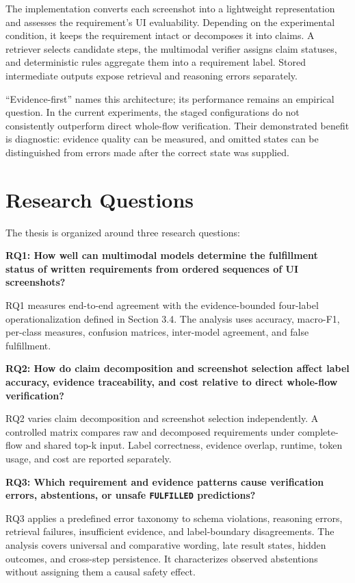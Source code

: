 The implementation converts each screenshot into a lightweight representation
and assesses the requirement's UI evaluability. Depending on the experimental
condition, it keeps the requirement intact or decomposes it into claims. A
retriever selects candidate steps, the multimodal verifier assigns claim
statuses, and deterministic rules aggregate them into a requirement label.
Stored intermediate outputs expose retrieval and reasoning errors separately.

``Evidence-first'' names this architecture; its performance remains an empirical
question. In the current experiments, the staged configurations do not
consistently outperform direct whole-flow verification. Their demonstrated
benefit is diagnostic: evidence quality can be measured, and omitted states can
be distinguished from errors made after the correct state was supplied.

\section{Research Questions}\label{research-questions}

The thesis is organized around three research questions:

\textbf{RQ1: How well can multimodal models determine the fulfillment status of written requirements from ordered sequences of UI screenshots?}

RQ1 measures end-to-end agreement with the evidence-bounded four-label
operationalization defined in Section 3.4. The analysis uses accuracy,
macro-F1, per-class measures, confusion matrices, inter-model agreement, and
false fulfillment.

\textbf{RQ2: How do claim decomposition and screenshot selection affect label accuracy, evidence traceability, and cost relative to direct whole-flow verification?}

RQ2 varies claim decomposition and screenshot selection independently. A
controlled matrix compares raw and decomposed requirements under complete-flow
and shared top-k input. Label correctness, evidence overlap, runtime, token usage, and
cost are reported separately.

\textbf{RQ3: Which requirement and evidence patterns cause verification errors, abstentions, or unsafe \texttt{FULFILLED} predictions?}

RQ3 applies a predefined error taxonomy to schema violations, reasoning errors,
retrieval failures, insufficient evidence, and label-boundary disagreements.
The analysis covers universal and comparative wording, late result states,
hidden outcomes, and cross-step persistence. It characterizes observed
abstentions without assigning them a causal safety effect.

